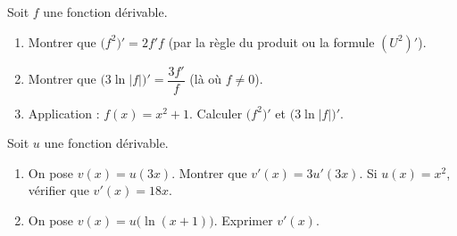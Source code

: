 \begin{exo}
Soit $f$ une fonction dérivable.
\begin{enumerate}[label=\alph*),leftmargin=7mm,itemsep=2pt]
\item Montrer que $\big(f^2\big)'=2f'f$ (par la règle du produit ou la formule $(U^2)'$).
\item Montrer que $\big(3\ln|f|\big)'=\dfrac{3f'}{f}$ (là où $f\neq 0$).
\item Application : $f(x)=x^2+1$. Calculer $\big(f^2\big)'$ et $\big(3\ln|f|\big)'$.
\end{enumerate}
\end{exo}

\begin{exo}
Soit $u$ une fonction dérivable.
\begin{enumerate}[label=\alph*),leftmargin=7mm,itemsep=2pt]
\item On pose $v(x)=u(3x)$. Montrer que $v'(x)=3u'(3x)$. Si $u(x)=x^2$, vérifier que $v'(x)=18x$.
\item On pose $v(x)=u\big(\ln(x+1)\big)$. Exprimer $v'(x)$.
\end{enumerate}
\end{exo}


